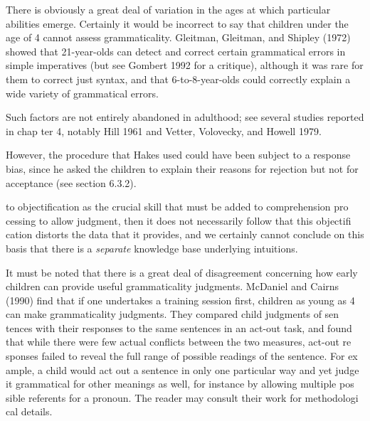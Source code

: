 \begin{listWWNumxlvleveli}
\item 
\begin{styleStandard}
There is obviously a great deal of variation in the ages at which particular abilities emerge. Certainly it would be incorrect to say that children under the age of 4 cannot assess grammaticality. Gleitman, Gleitman, and Shipley (1972) showed that 21-year-olds can detect and correct certain grammatical errors in simple imperatives (but see Gombert 1992 for a critique), although it was rare for them to correct just syntax, and that 6-to-8-year-olds could correctly explain a wide variety of grammatical errors.
\end{styleStandard}


\item 
\begin{styleStandard}
Such factors are not entirely abandoned in adulthood; see several studies reported in chap\- ter 4, notably Hill 1961 and Vetter, Volovecky, and Howell 1979.
\end{styleStandard}


\end{listWWNumxlvleveli}
\setcounter{listWWNumxlivleveli}{33}
\begin{listWWNumxlivleveli}
\item 
\begin{styleStandard}
However, the procedure that Hakes used could have been subject to a response bias, since he asked the children to explain their reasons for rejection but not for acceptance (see section 6.3.2).
\end{styleStandard}


\end{listWWNumxlivleveli}
\clearpage\setcounter{page}{1}\begin{styleTextbody}
to objectification as the crucial skill that must be added to comprehension pro\- cessing to allow judgment, then it does not necessarily follow that this objectifi\- cation distorts the data that it provides, and we certainly cannot conclude on this basis that there is a \textit{separate}\textit{ }knowledge base underlying intuitions.
\end{styleTextbody}


\begin{styleTextbody}
It must be noted that there is a great deal of disagreement concerning how early children can provide useful grammaticality judgments. McDaniel and Cairns (1990) find that if one undertakes a training session first, children as young as 4 can make grammaticality judgments. They compared child judgments of sen\- tences with their responses to the same sentences in an act-out task, and found that while there were few actual conflicts between the two measures, act-out re\- sponses failed to reveal the full range of possible readings of the sentence. For ex\- ample, a child would act out a sentence in only one particular way and yet judge it grammatical for other meanings as well, for instance by allowing multiple pos\- sible referents for a pronoun. The reader may consult their work for methodologi\- cal details.
\end{styleTextbody}



